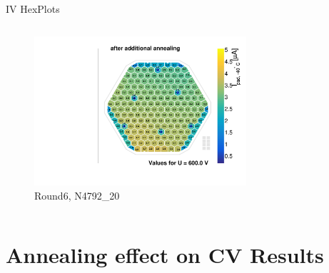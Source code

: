 \documentclass{beamer}
\begin{document}
\begin{frame}{IV HexPlots}
\begin{columns}
    \begin{figure}
      \includegraphics[width=0.7\textwidth]{plots/N4792_20.pdf}
      \caption{Round6, N4792\_20}
    \end{figure}

  \end{columns}
\end{frame}




\section{Annealing effect on CV Results}

\subsection{}
\end{document}
